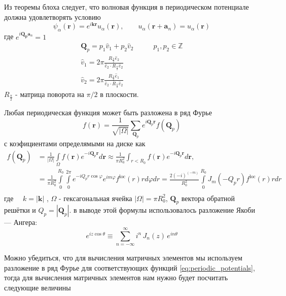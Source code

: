 \documentclass[a4paper,article,14pt]{extarticle}
\begin{document}
\noindent Из теоремы блоха следует, что волновая функция в периодическом потенциале должна  удовлетворять условию
$$
\psi_\alpha (\mathbf{r}) =  e^{i \mathbf{k} \mathbf{r}} u_ \alpha (\mathbf{r} ), \qquad u_ \alpha (\mathbf{r} + \mathbf{a}_n) = u_ \alpha (\mathbf{r})
$$
где $e^{i \mathbf{Q_p} \mathbf{a}_n }=1$
\begin{equation}
\begin{aligned}
\mathbf{Q}_p = p_1 \hat {v}_1 + p_2 \hat {v}_2  &\qquad p_1,p_2 \in \mathbb{Z} \\
\hat{v}_1 = 2 \pi  \frac{ R_{\frac \pi 2} \hat {e}_2}{\hat {e}_2   \cdot R_{\frac \pi 2} \hat {e}_2}  \\
\hat{v}_2 =  2 \pi  \frac{ R_{\frac \pi 2} \hat {e}_1}{\hat {e}_2 \cdot R_{\frac \pi 2} \hat {e}_2}
\end{aligned}
\end{equation}
$R_{\frac \pi 2}$ - матрица поворота на $\pi/2$ в плоскости.

\noindent Любая периодическая функция может быть разложена в ряд Фурье 
$$f (\mathbf{r}) = \frac{1}{\sqrt{|\Omega|}} \sum\limits_{\mathbf{Q}_p} e^{i \mathbf{Q}_p  \mathbf{r}} f(\mathbf{Q}_p) $$
с коэфициентами определямыми на диске как
\begin{equation}
\begin{aligned}
f (\mathbf{Q}_p) &= \frac{1} {|\Omega|} \int\limits_\Omega f (  \mathbf{r} ) e^{- i \mathbf{Q}_p \mathbf{r}} d \mathbf{r} \approx \frac{1}{\pi R_0^2}  \int_{r<R_{0}}  f(\mathbf{r})   e^{-i\mathbf{Q}_p  \mathbf{r}}  d \mathbf{r} , \\
&   =\frac{1}{\pi R_0^2}  \int\limits_{0}^{R_0}  \int\limits_{0}^{2 \pi} e^{-i Q_p r \cos{\varphi}} e^{i m \varphi} f^{\text{loc}}(r) r d\varphi dr =\frac{2 (-i)^{(-m)}}{R_0^2}  \int\limits_{0}^{R_0}  J_{m} (-Q_p r ) f^{\text{loc}}(r) r dr     \\
\end{aligned}
\end{equation} 
где $\quad k = \left|\mathbf{k}\right| $ ,
$\Omega$ - гексагональная ячейка $|\Omega| = \pi R_0^2$, $\mathbf{Q}_p$ вектора обратной решётки и $Q_p=|\mathbf{Q}_p|$.
в выводе этой формулы использовалось разложение Якоби — Ангера:
$$
e^{i z \cos \theta} \equiv \sum_{n=-\infty}^{\infty} i^n\, J_n(z)\, e^{i n \theta}
$$

Можно убедиться, что для вычисления матричных элементов мы используем разложение в ряд Фурье для соответствующих функций \eqref{eq:periodic_potentials}, тогда для вычисления матричных элементов нам нужно будет посчитать следующие  величины
\end{document}
